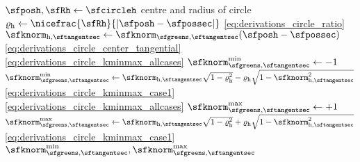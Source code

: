 \begin{algorithmic}[1]
  \State $\sfposh, \sfRh \gets \sfcircleh$
  \Comment centre and radius of circle
  \State $\varrho_{\mathrm h} \gets 
  \nicefrac{\sfRh}{|\sfposh-\sfpossec|}$
  \Comment \eqref{eq:derivations_circle_ratio}
  \State $\sfknorm_{\mathrm h, \sftangentsec} \gets
  \sfknorm_{\sfgreens,\sftangentsec}(\sfposh - 
  \sfpossec)$
  \Comment \eqref{eq:derivations_circle_center_tangential}
  \Comment \eqref{eq:derivations_circle_kminmax_allcases}
  \State $\sfknorm^{\min}_{\sfgreens, \sftangentsec} \gets -1$
  \Else
  \State $\sfknorm^{\min}_{\sfgreens, \sftangentsec} \gets 
  \sfknorm_{\mathrm h, \sftangentsec} \sqrt{1-\varrho_{\mathrm h}^2}
  - \varrho_{\mathrm h} \sqrt{1 - \sfknorm_{\mathrm h, \sftangentsec}^2}  
  $
  \Comment \eqref{eq:derivations_circle_kminmax_case1}
  \EndIf
  \Comment \eqref{eq:derivations_circle_kminmax_allcases}
  \State $\sfknorm^{\max}_{\sfgreens, \sftangentsec} \gets +1$
  \Else
  \State $\sfknorm^{\max}_{\sfgreens, \sftangentsec} \gets 
  \sfknorm_{\mathrm h, \sftangentsec} \sqrt{1-\varrho_{\mathrm h}^2}
  + \varrho_{\mathrm h} \sqrt{1 - \sfknorm_{\mathrm h, \sftangentsec}^2} $
  \Comment \eqref{eq:derivations_circle_kminmax_case1}
  \EndIf
  \State \Return $\sfknorm^{\min}_{\sfgreens, \sftangentsec},
  \sfknorm^{\max}_{\sfgreens, \sftangentsec}$
  \EndFunction
\end{algorithmic}
